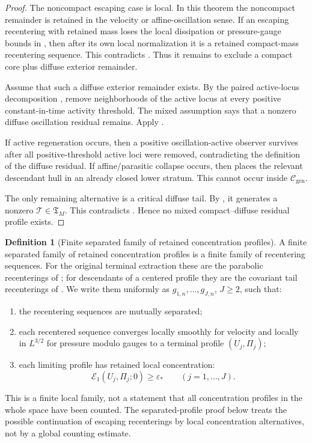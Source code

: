 \documentclass[11pt]{amsart}
\numberwithin{equation}{section}
\theoremstyle{plain}
\theoremstyle{definition}
\newtheorem{definition}[theorem]{Definition}
\theoremstyle{remark}
\newcommand{\eps}{\varepsilon}
\newcommand{\calE}{\mathcal E}
\newcommand{\Cgen}{\mathcal C_{\mathrm{gen}}}
\newcommand{\Tcrit}{\mathfrak T_M}
\begin{document}
\begin{proof}
The noncompact escaping case is local.  In this theorem the noncompact
remainder is retained in the velocity or affine-oscillation sense.  If an
escaping recentering with retained mass loses the local dissipation or
pressure-gauge bounds in , then after its own local
normalization it is a retained compact-mass recentering sequence.  This
contradicts .  Thus it remains to exclude a
compact core plus diffuse exterior remainder.

Assume that such a diffuse exterior remainder exists.  By the paired
active-locus decomposition , remove
neighborhoods of the active locus at every positive constant-in-time activity
threshold.  The mixed assumption says that a nonzero diffuse oscillation
residual remains.  Apply .

If active regeneration occurs, then a positive oscillation-active observer
survives after all positive-threshold active loci were removed, contradicting
the definition of the diffuse residual.  If affine/parasitic collapse occurs,
then  places
the relevant descendant hull in an already closed lower stratum.  This cannot
occur inside \(\Cgen\).

The only remaining alternative is a critical diffuse tail.  By
, it generates a nonzero
\(\mathcal T\in\Tcrit\).  This contradicts
.  Hence no mixed compact--diffuse residual
profile exists.
\end{proof}

\begin{definition}[Finite separated family of retained concentration profiles]
\label{def:finite-separated-profile-family}
A finite separated family of retained concentration profiles is a finite
family of recentering sequences.  For the original terminal extraction these
are the parabolic recenterings of ; for
descendants of a centered profile they are the covariant tail recenterings of
.  We write them uniformly as
\(g_{1,n},\dots,g_{J,n}\), \(J\ge2\), such that:
\begin{enumerate}[label=(\roman*)]
   \item the recentering sequences are mutually separated;
   \item each recentered sequence converges locally smoothly for velocity and
   locally in \(L^{3/2}\) for pressure modulo gauges to a terminal profile
   \((U_j,\Pi_j)\);
   \item each limiting profile has retained local concentration:
\[
   \calE_1(U_j,\Pi_j;0)\ge\eps_*
   \qquad (j=1,\dots,J).
\]
\end{enumerate}
This is a finite local family, not a statement that all concentration profiles
in the whole space have been counted.  The separated-profile proof below treats
the possible continuation of escaping recenterings by local concentration
alternatives, not by a global counting estimate.
\end{definition}
\end{document}
